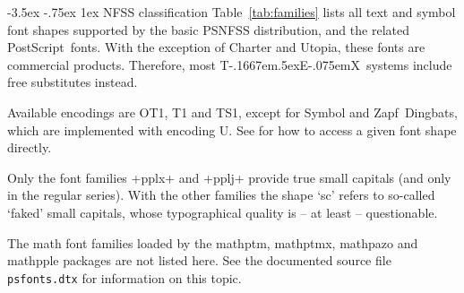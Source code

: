 \documentclass[11pt]{ltxguide}[1995/11/28]
\makeatletter
\renewcommand\section{\@startsection{section}{1}{\z@}%
{-3.5ex \@plus -.75ex}%
{1ex}%
{\normalfont\Large\bfseries}}
\def\ptmTeX{T\kern-.1667em\lower.5ex\hbox{E}\kern-.075emX\@}
\let\TeX=\ptmTeX
\newcommand{\ps}{PostScript}
\newcommand{\Lpack}[1]{\textsf{#1}}
\makeatother
\begin{document}
\section{NFSS classification}
Table~\vref{tab:families} lists all text and symbol font shapes 
supported by the basic PSNFSS distribution,
and the related \ps\ fonts.
With the exception of Charter and Utopia, these fonts are commercial products.  
Therefore, most \TeX\ systems include free substitutes instead.

Available encodings are OT1, T1 and TS1, except for 
Symbol and Zapf~Dingbats, which are implemented with encoding U.
See \cite{fntguide} for how to access a given font shape directly.

Only the font families +pplx+ and +pplj+ provide true small capitals
(and only in the regular series).
With the other families the shape `sc' refers to so-called `faked' small capitals,
whose typographical quality is -- at least -- questionable.

The math font families loaded by the
\Lpack{mathptm}, \Lpack{mathptmx}, \Lpack{mathpazo} and \Lpack{mathpple} packages
are not listed here.
See the documented source file \texttt{psfonts.dtx} 
for information on this topic.
\end{document}

